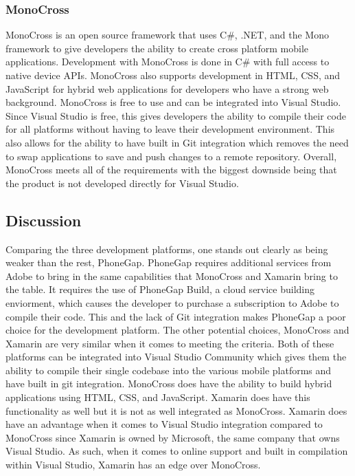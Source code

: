 \documentclass[onecolumn, draftclsnofoot,10pt, compsoc]{IEEEtran}
\begin{document}
\begin{singlespace}
\subsubsection{MonoCross}

MonoCross is an open source framework that uses C\#, .NET, and the Mono framework to give developers the ability to create cross platform mobile applications. Development with MonoCross is
done in C\# with full access to native device APIs. MonoCross also supports development in HTML, CSS, and JavaScript for hybrid web applications for developers who have a strong web background.
MonoCross is free to use and can be integrated into Visual Studio.
Since Visual Studio is free, this gives developers the ability to compile their code for all platforms without having to leave their development environment. This also allows for the ability to have built in Git
integration which removes the need to swap applications to save and push changes to a remote repository. Overall, MonoCross meets all of the requirements with the biggest downside being that the product
is not developed directly for Visual Studio.

\subsection{Discussion}

Comparing the three development platforms, one stands out clearly as being weaker than the rest, PhoneGap. 
PhoneGap requires additional services from Adobe to bring in the same capabilities that MonoCross and Xamarin bring to the table. It requires the use of PhoneGap Build, a cloud service building enviorment,
which causes the developer to purchase a subscription to Adobe to compile their code. This and the lack of Git integration makes PhoneGap a poor choice for the development platform.
The other potential choices, MonoCross and Xamarin are very similar when it comes to meeting the criteria. Both of these platforms can be integrated into Visual Studio Community which gives them 
the ability to compile their single codebase into the various mobile platforms and have built in git integration. MonoCross does have the ability to build hybrid applications using HTML, CSS, and JavaScript. Xamarin
does have this functionality as well but it is not as well integrated as MonoCross. Xamarin does have an advantage when it comes to Visual Studio integration compared to MonoCross since Xamarin is owned by Microsoft, the same
company that owns Visual Studio. As such, when it comes to online support and built in compilation within Visual Studio, Xamarin has an edge over MonoCross.


\end{singlespace}
\end{document}
